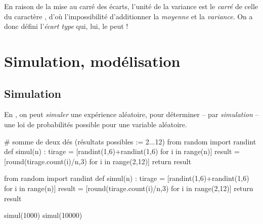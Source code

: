 \documentclass[a4paper,11pt]{article}
\begin{document}
\begin{crmq}
En raison de la mise au carré des écarts, l'unité de la variance est le \textit{carré} de celle du caractère , d'où l'impossibilité d'additionner la \textit{moyenne} et la \textit{variance}. On a donc défini l'\textit{écart type} qui, lui, le peut !
\end{crmq}

\section{Simulation, modélisation}

\subsection{Simulation}

\begin{cpython}
En \calgpython, on peut \textit{simuler} une expérience aléatoire, pour déterminer -- par \textit{simulation} -- une loi de probabilités possible pour une variable aléatoire.

\begin{tcpythoncode}[15cm]
	\begin{pyverbatim}[][fontsize=\footnotesize,numbers=left,numbersep=10pt]
		# somme de deux dés (résultats possibles := 2...12)
		from random import randint
		def simul(n) :
			tirage = [randint(1,6)+randint(1,6) for i in range(n)]
			result = [round(tirage.count(i)/n,3) for i in range(2,12)]
			return result
	\end{pyverbatim}
\end{tcpythoncode}

\begin{pyconcode}
from random import randint
def simul(n) :
	tirage = [randint(1,6)+randint(1,6) for i in range(n)]
	result = [round(tirage.count(i)/n,3) for i in range(2,12)]
	return result
	

\end{pyconcode}
	
\begin{consolepython}[15cm]
\begin{pyconsole}[][framesep=3mm,frame=single,label={[\scriptsize Début de la console \logopython]\scriptsize Fin de la console \logopython},fontsize=\footnotesize,framerule=1pt,rulecolor=\color{ForestGreen}]
simul(1000)
simul(10000)
\end{pyconsole}
\end{consolepython}
\end{cpython}
\end{document}
